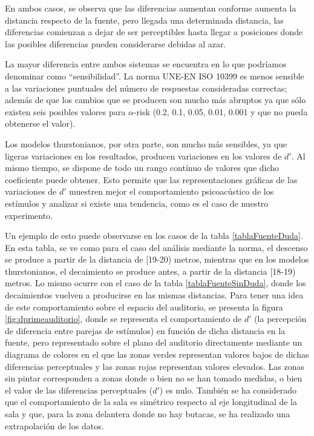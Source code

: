 \documentclass[11pt,a4paper]{book}
\begin{document}
            En ambos casos, se observa que las diferencias aumentan conforme aumenta la distancia respecto de la fuente, pero llegada una determinada distancia, las diferencias comienzan a dejar de ser perceptibles hasta llegar a posiciones donde las posibles diferencias pueden considerarse debidas al azar.
            
            La mayor diferencia entre ambos sistemas se encuentra en lo que podríamos denominar como ``sensibilidad''. La norma UNE-EN ISO 10399 es menos sensible a las variaciones puntuales del número de respuestas consideradas correctas; además de que los cambios que se producen son mucho más abruptos ya que sólo existen seis posibles valores para $\alpha$-risk (0.2, 0.1, 0.05, 0.01, 0.001 y que no pueda obtenerse el valor).
            
            Los modelos thurstonianos, por otra parte, son mucho más sensibles, ya que ligeras variaciones en los resultados, producen variaciones en los valores de $d'$. Al mismo tiempo, se dispone de todo un rango contínuo de valores que dicho coeficiente puede obtener. Esto permite que las representaciones gráficas de las variaciones de $d'$ muestren mejor el comportamiento psicoacústico de los estímulos y analizar si existe una tendencia, como es el caso de nuestro experimento.
            
            Un ejemplo de esto puede observarse en los casos de la tabla \ref{tablaFuenteDuda}. En esta tabla, se ve como para el caso del análisis mediante la norma, el descenso se produce a partir de la distancia de [19-20) metros, mientras que en los modelos thurstonianos, el decaimiento se produce antes, a partir de la distancia [18-19) metros. Lo mismo ocurre con el caso de la tabla \ref{tablaFuenteSinDuda}, donde los decaimientos vuelven a producirse en las mismas distancias. Para tener una idea de este comportamiento sobre el espacio del auditorio, se presenta la figura \ref{fig:dprimeauditorio}, donde se representa el comportamiento de $d'$ (la percepción de diferencia entre parejas de estímulos) en función de dicha distancia en la fuente, pero representado sobre el plano del auditorio directamente mediante un diagrama de colores en el que las zonas verdes representan valores bajos de dichas diferencias perceptuales y las zonas rojas representan valores elevados. Las zonas sin pintar corresponden a zonas donde o bien no se han tomado medidas, o bien el valor de las diferencias perceptuales ($d'$) es nulo. También se ha considerado que el comportamiento de la sala es simétrico respecto al eje longitudinal de la sala y que, para la zona delantera donde no hay butacas, se ha realizado una extrapolación de los datos.
            
\end{document}
